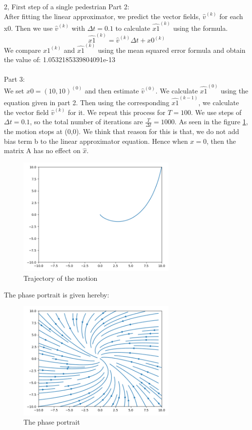 \documentclass[10pt,a4paper]{article}
\begin{document}
\begin{task}{2, First step of a single pedestrian}
Part 2: \\
After fitting the linear approximator, we predict the vector fields, $\hat{v}^{(k)}$ for each x0. Then we use $\hat{v}^{(k)}$ with $\Delta t = 0.1$ to calculate $\hat{x1}^{(k)}$ using the formula.
\begin{equation*}
\hat{x1}^{(k)} = \hat{v}^{(k)}\Delta t + x0^{(k)}
\end{equation*}
We compare $x1^{(k)}$ and $\hat{x1}^{(k)}$ using the mean squared error formula and obtain the value of: 1.0532185339804091e-13 \\\\
Part 3: \\
We set $x0=(10, 10)^{(0)}$ and then estimate $\hat{v}^{(0)}$. We calculate $\hat{x1}^{(0)}$ using the equation given in part 2. Then using the corresponding $\hat{x1}^{(k-1)}$, we calculate the vector field $\hat{v}^{(k)}$ for it. We repeat this process for $T = 100$. We use steps of $\Delta t = 0.1$, so the total number of iterations are $\frac{T}{\Delta t} = 1000$. 
As seen in the figure \ref{fig:task2_3}, the motion stops at (0,0). We think that reason for this is that, we do not add bias term b to the linear approximator equation. Hence when $x=0$, then the matrix A has no effect on $\hat{x}$.

\begin{figure}[H]
\centering
\includegraphics[width=0.7\textwidth]{../plots/task2_part3.png}
\caption{Trajectory of the motion}
\label{fig:task2_3}
\end{figure}

The phase portrait is given hereby:
\begin{figure}[H]
\centering
\includegraphics[width=0.7\textwidth]{../plots/task2_part3_phase.png}
\caption{The phase portrait}
\label{fig:task2_3_phase}
\end{figure}


\end{task}
\end{document}
